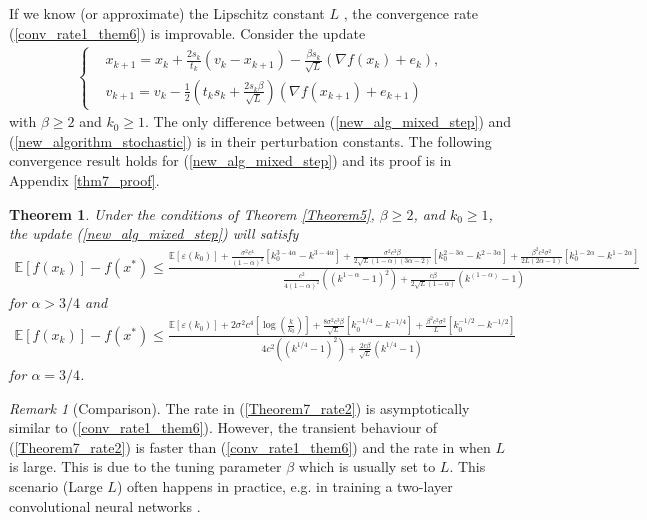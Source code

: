\documentclass{article}
\theoremstyle{plain}
\newtheorem{theorem}{Theorem}[section]
\theoremstyle{definition}
\theoremstyle{remark}
\newtheorem{remark}{Remark}[theorem]
\begin{document}
If we know (or approximate) the Lipschitz constant $L$ , the convergence rate (\ref{conv_rate1_them6}) is improvable. Consider the update
\begin{align}\label{new_alg_mixed_step}
    \left\{ \begin{array}{ll}
    &x_{k+1}   =    x_{k} + \frac{2s_k}{t_k}(v_k-x_{k+1})-\frac{\beta s_k}{\sqrt{L}}(\nabla f(x_k)+e_k),\\
     &v_{k+1}    = v_k -\tfrac{1}{2}(t_ks_k+\tfrac{2s_k \beta}{\sqrt{L}})(\nabla f(x_{k+1})+e_{k+1})
    \end{array}\right.
\end{align}
with $\beta \geq 2$ and $k_0\geq 1$. The only difference between (\ref{new_alg_mixed_step}) and (\ref{new_algorithm_stochastic}) is in their perturbation constants. The following convergence result holds for (\ref{new_alg_mixed_step}) and its proof is in Appendix \ref{thm7_proof}.
\begin{theorem}\label{Theorem6}
    Under the conditions of Theorem \ref{Theorem5}, $\beta \geq 2$, and $k_0\geq 1$, the update (\ref{new_alg_mixed_step}) will satisfy 
    \begin{align}
        \mathbb E[f(x_k)]-f(x^*)\leq \tfrac{\mathbb E[\varepsilon(k_0)]+\frac{\sigma^2 c^4}{(1-\alpha)^2} \left[ k_0^{3-4\alpha}-k^{3-4\alpha} \right] + \frac{\sigma^2c^3\beta}{2\sqrt{L}(1-\alpha)(3\alpha -2)}\left[ k_0^{2-3\alpha}-k^{2-3\alpha} \right]+\frac{\beta^2c^2\sigma^2}{2L(2\alpha-1)}\left[ k_0^{1-2\alpha}-k^{1-2\alpha} \right]}{\frac{c^2}{4(1-\alpha)^2}\left((k^{1-\alpha}-1)^2\right)+\frac{c\beta}{2\sqrt{L}(1-\alpha)}\left(k^{(1-\alpha)}-1\right)}\nonumber
    \end{align}
    for $\alpha > 3/4$ and
    \begin{align}\label{Theorem7_rate2}
        \mathbb E[f(x_k)]-f(x^*)\leq \tfrac{\mathbb E[\varepsilon(k_0)]+2\sigma^2 c^4 \left[ \log(\frac{k}{k_0}) \right] + \frac{8\sigma^2c^3\beta}{\sqrt{L}}\left[ k_0^{-1/4}-k^{-1/4} \right]
        +\frac{\beta^2c^2\sigma^2}{L}\left[ k_0^{-1/2}-k^{-1/2} \right]}{4c^2\left((k^{1/4}-1)^2\right)+\frac{2c\beta}{\sqrt{L}}\left(k^{1/4}-1\right)}
    \end{align}
    for $\alpha=3/4$.
\end{theorem}
\begin{remark}[Comparison]
    The rate in (\ref{Theorem7_rate2}) is asymptotically similar to (\ref{conv_rate1_them6}). However, the transient behaviour of (\ref{Theorem7_rate2}) is faster than (\ref{conv_rate1_them6}) and the rate in \citep{pmlr-v108-laborde20a} when \(L\) is large. This is due to the tuning parameter \(\beta\) which is usually set to \(L\). This scenario (Large \(L\)) often happens in practice, e.g. in training a two-layer convolutional neural networks \citep{shi2022efficiently}. 
\end{remark}
\end{document}
